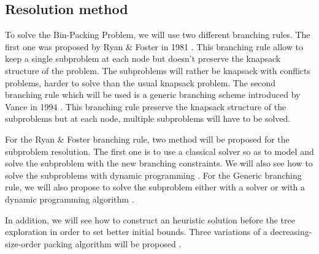 \subsection{Resolution method}

To solve the Bin-Packing Problem, we will use two different branching rules. The first one was proposed by Ryan \& Foster in 1981 \cite{ryan1981rn}. This branching rule allow to keep a single subproblem at each node but doesn't preserve the knapsack structure of the problem. The subproblems will rather be knapsack with conflicts problems, harder to solve than the usual knapsack problem. The second branching rule which will be used is a generic branching scheme introduced by Vance in 1994 \cite{vance1994solving}. This branching rule preserve the knapsack structure of the subproblems but at each node, multiple subproblems will have to be solved.

For the Ryan \& Foster branching rule, two method will be proposed for the subproblem resolution. The first one is to use a classical solver so as to model and solve the subproblem with the new branching constraints. We will also see how to solve the subproblems with dynamic programming \cite{toth1980dynamic}. For the Generic branching rule, we will also propose to solve the subproblem either with a solver or with a dynamic programming algorithm \cite{sadykov2013bin}.

In addition, we will see how to construct an heuristic solution before the tree exploration in order to set better initial bounds. Three  variations of a decreasing-size-order packing algorithm will be proposed \cite{bhatia2009better}.